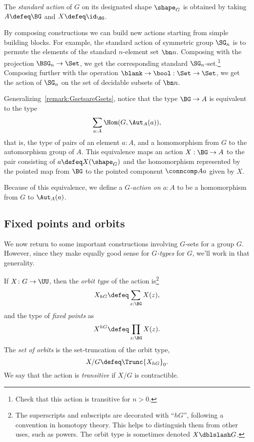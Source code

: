 \begin{definition}\label{std-action}
  The \emph{standard action} of $G$ on its designated shape $\shape_G$ is obtained by
  taking $A \defeq \BG$ and $X \defeq \id_{\BG}$.
\end{definition}

\begin{example}
  By composing constructions we can build new actions
  starting from simple building blocks.
  For example, the standard action of symmetric group $\SG_n$
  is to permute the elements of the standard $n$-element set $\bn n$.
  Composing with the projection $\BSG_n \to \Set$,
  we get the corresponding standard $\SG_n$-set.\footnote{%
    Check that this action is transitive for $n>0$.}
  Composing further with the operation $\blank \to \bool : \Set \to \Set$,
  we get the action of $\SG_n$ on the set of decidable subsets of $\bn n$.
\end{example}

Generalizing~\cref{remark:GsetsareGsets},
notice that the type $\BG \to A$ is equivalent to the type
\[
  \sum_{a:A}\Hom(G,\Aut_A(a)),
\]
that is, the type of pairs of an element $a : A$,
and a homomorphism from $G$ to the automorphism group of $A$.
This equivalence maps an action $X:\BG\to A$
to the pair consisting of $a \defeq X(\shape_G)$
and the homomorphism represented by the pointed map
from $\BG$ to the pointed component $\conncomp A a$ given by $X$.

Because of this equivalence,
we define a \emph{$G$-action on $a:A$}
to be a homomorphism from $G$ to $\Aut_A(a)$.

\subsection{Fixed points and orbits}
\label{sec:fixpts-orbits}
We now return to some important constructions involving $G$-sets for a group $G$.
However, since they make equally good sense for \emph{$G$-types} for \aninftygp
$G$, we'll work in that generality.
\begin{definition}
  \label{def:orbittype}
  If $X\colon G\to\UU$, then the \emph{orbit type}
  of the action is\footnote{%
    The superscripts and subscripts are decorated with ``$hG$'',
    following a convention in homotopy theory.
    This helps to distinguish them from other uses, such as powers.
    The orbit type is sometimes denoted $X \dblslash G$.}
\[
  X_{hG} \defeq \sum_{z:\BG} X(z),
\]
and the type of \emph{fixed points} as
\[
  X^{hG} \defeq \prod_{z:\BG} X(z).
\]
The \emph{set of orbits} is the set-truncation of the orbit type,
\[
  X / G \defeq \Trunc{X_{hG}}_0.
\]
We say that the action is \emph{transitive} if $X / G$ is contractible.
\end{definition}

